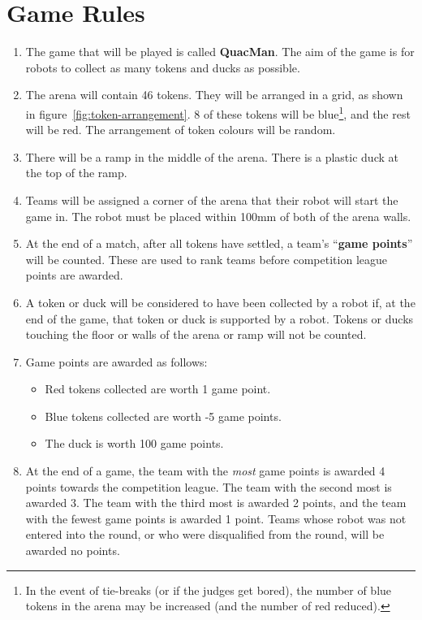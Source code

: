 \section {Game Rules}
\label{game-rules}

\begin{enumerate}
\item The game that will be played is called \textbf{QuacMan}.  The aim of the game is for robots to collect as many tokens and ducks as possible.
\item The arena will contain 46 tokens.  They will be arranged in a grid, as shown in figure~\ref{fig:token-arrangement}.  8 of these tokens will be blue\footnote{In the event of tie-breaks (or if the judges get bored), the number of blue tokens in the arena may be increased (and the number of red reduced).}, and the rest will be red.  The arrangement of token colours will be random.
\item There will be a ramp in the middle of the arena.  There is a plastic duck at the top of the ramp.
\item Teams will be assigned a corner of the arena that their robot will start the game in.  The robot must be placed within 100mm of both of the arena walls.
\item At the end of a match, after all tokens have settled, a team's ``\textbf{game points}'' will be counted.
 These are used to rank teams before competition league points are awarded.
\item A token or duck will be considered to have been collected by a robot if, at the end of the game, that token or duck is supported by a robot.  Tokens or ducks touching the floor or walls of the arena or ramp will not be counted.

\item Game points are awarded as follows:
\begin{itemize}
\item Red tokens collected are worth 1 game point.
\item Blue tokens collected are worth -5 game points.
\item The duck is worth 100 game points.
\end{itemize}

\item At the end of a game, the team with the \emph{most} game points is awarded 4 points towards the competition league.
 The team with the second most is awarded 3.
 The team with the third most is awarded 2 points, and the team with the fewest game points is awarded 1 point.
 Teams whose robot was not entered into the round, or who were disqualified from the round, will be awarded no points.


\end{enumerate}
